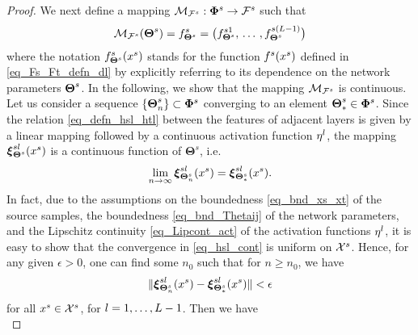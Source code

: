 \documentclass[review,supplement,onefignum,onetabnum]{siamonline250211}
\begin{document}
\begin{proof}
We next define a mapping $\mathcal{M}_{\mathcal{F}^s}: \mathbf{\Phi}^{s} \rightarrow \mathcal{F}^s $ such that
% 
\begin{equation}
\label{eq_defn_mapFs}
\begin{split}
\mathcal{M}_{\mathcal{F}^s}(\boldsymbol{\Theta}^{s}) = f^s_{\boldsymbol{\Theta}^{s}}=\big( f^{s1}_{\boldsymbol{\Theta}^{s}} , \, \dots \, , f^{s(L-1)}_{\boldsymbol{\Theta}^{s}}    \big) 
\end{split}
\end{equation}
%
where the notation $ f^s_{\boldsymbol{\Theta}^{s}}(x^s)$ stands for the function $ f^s(x^s)$ defined in \eqref{eq_Fs_Ft_defn_dl} by explicitly referring to its dependence on the network parameters $\boldsymbol{\Theta}^{s} $. In the following, we show that the mapping $\mathcal{M}_{\mathcal{F}^s} $ is continuous. Let us consider a sequence $\{ \boldsymbol{\Theta}^{s}_n \}\subset \mathbf{\Phi}^{s} $ converging to an element $ \boldsymbol{\Theta}^{s}_* \in \mathbf{\Phi}^{s}$.  Since the relation \eqref{eq_defn_hsl_htl} between the features of adjacent layers is given by a linear mapping followed by a continuous activation function $\eta^l$, the mapping $\boldsymbol{\xi}^{sl}_{\boldsymbol{\Theta}^{s}} (x^s) $ is a continuous function of $\boldsymbol{\Theta}^s$, i.e. 
%
\begin{equation}
\label{eq_hsl_cont}
\lim_{n \rightarrow \infty} \boldsymbol{\xi}^{sl}_{\boldsymbol{\Theta}^{s}_n} (x^s) =\boldsymbol{\xi}^{sl}_{\boldsymbol{\Theta}^{s}_*} (x^s).
\end{equation}
%
In  fact, due to the assumptions on the boundedness \eqref{eq_bnd_xs_xt} of the source samples, the boundedness \eqref{eq_bnd_Thetaij} of the network parameters, and the Lipschitz continuity \eqref{eq_Lipcont_act} of the activation functions $\eta^l$, it is easy to show that the convergence in \eqref{eq_hsl_cont} is uniform on $\mathcal{X}^s$. Hence, for any given $\epsilon >0$, one can find some $n_0$ such that for $n \geq n_0$, we have
%
\[
\| \boldsymbol{\xi}^{sl}_{\boldsymbol{\Theta}^{s}_n} (x^s) -  \boldsymbol{\xi}^{sl}_{\boldsymbol{\Theta}^{s}_*} (x^s)  \| < \epsilon
\]
%
for all $x^s \in \mathcal{X}^s$, for $l=1, \dots, L-1$. Then we have
%
%
\begin{equation*}

\end{equation*}
\end{proof}
\end{document}
